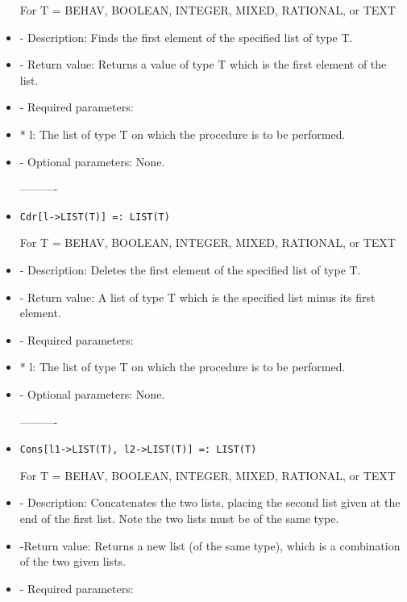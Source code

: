\begin{itemize}
For T = BEHAV, BOOLEAN, INTEGER, MIXED, RATIONAL, or TEXT 

\bd
\item
- Description:  Finds the first element of the specified list of type T.
\item
- Return value:  Returns a value of type T which is the first element
of the list.
\item - Required parameters:
	
\bd
\item
* l:  The list of type T on which the procedure is to be performed.
\ed

\item
- Optional parameters:  None.
\ed

----------
\item

\begin{verbatim}
Cdr[l->LIST(T)] =: LIST(T)
\end{verbatim}

For T = BEHAV, BOOLEAN, INTEGER, MIXED, RATIONAL, or TEXT

\bd
\item
- Description:  Deletes the first element of the specified list of type T.
\item -	Return value:  A list of type T which is the specified list minus its
first element.
\item   
- Required parameters:

\bd
\item
*  l:  The list of type T on which the procedure is to be performed.
\ed
\item
- Optional parameters:  None.
\ed

----------

\item

\begin{verbatim}
Cons[l1->LIST(T), l2->LIST(T)] =: LIST(T)
\end{verbatim}

For T = BEHAV, BOOLEAN, INTEGER, MIXED, RATIONAL, or TEXT

\bd
\item
- Description:  Concatenates the two lists, placing the second list given
at the end of the first list.  Note the two lists must be of the same type.
\item -Return value:  Returns a new list (of the same type), which is a 
combination of the two given lists.
\item
- Required parameters:


\end{itemize}
